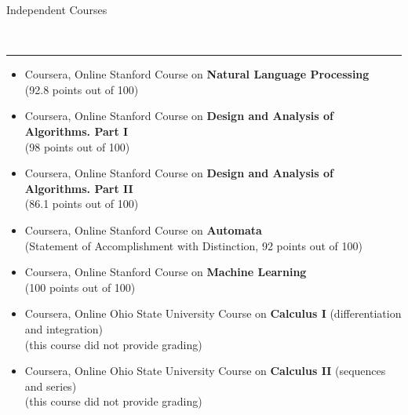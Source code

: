 \documentclass{article}
\newcommand{\cvheader}[1]{\vspace{0.5cm}
  {\raggedright \Large \sc #1}\\\rule[1em]{\textwidth}{0.1mm}}
\begin{document}
\cvheader{Independent Courses}
\begin{itemize}
\item Coursera, Online Stanford Course on \textbf{Natural Language
  Processing}\\(92.8 points out of 100)
\item Coursera, Online Stanford Course on \textbf{Design and Analysis
  of Algorithms. Part I}\\(98 points out of 100)
\item Coursera, Online Stanford Course on \textbf{Design and Analysis
  of Algorithms. Part II}\\(86.1 points out of 100)
\item Coursera, Online Stanford Course on
  \textbf{Automata}\\(Statement of Accomplishment with Distinction, 92
  points out of 100)
\item Coursera, Online Stanford Course on \textbf{Machine
  Learning}\\(100 points out of 100)
\item Coursera, Online Ohio State University Course on
  \textbf{Calculus I} (differentiation and integration)\\(this course did not provide grading)
\item Coursera, Online Ohio State University Course on
  \textbf{Calculus II} (sequences and series)\\(this course did not provide grading)
\end{itemize}
\end{document}
